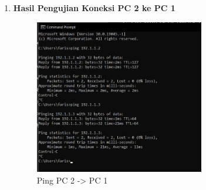 \begin{enumerate}
    \item \textbf{Hasil Pengujian Koneksi PC 2 ke PC 1}
    
    \begin{figure}[H]
        \centering
        \includegraphics[width=0.7\textwidth]{img/hasil_pc2.jpeg}
        \caption{Ping PC 2 -> PC 1}
        \label{fig:pengujian_koneksi_pc2}
    \end{figure}

\end{enumerate}